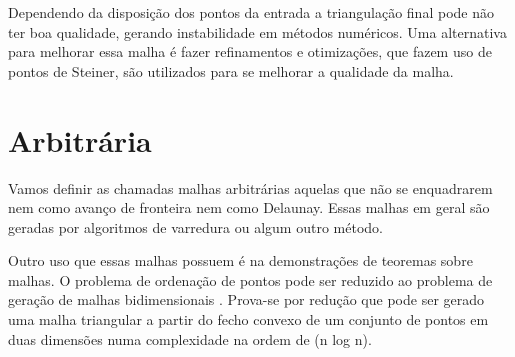  Dependendo da disposição dos pontos da entrada a triangulação final pode não ter boa qualidade, gerando instabilidade em métodos numéricos. Uma alternativa para melhorar essa malha é fazer refinamentos e otimizações, que fazem uso de pontos de Steiner, são utilizados para se melhorar a qualidade da malha.

\section{Arbitrária}

Vamos definir as chamadas malhas arbitrárias aquelas que não se enquadrarem nem como avanço de fronteira nem como Delaunay. Essas malhas em geral são geradas por algoritmos de varredura ou algum outro método. 

Outro uso que essas malhas possuem é na demonstrações de teoremas sobre malhas. O problema de ordenação de pontos pode ser reduzido ao problema de geração de malhas bidimensionais \cite{bib:CarvalhoFigueiredo91}. Prova-se por redução que pode ser gerado uma malha triangular a partir do fecho convexo de um conjunto de pontos em duas dimensões numa complexidade na ordem de (n log n).
